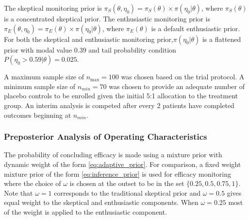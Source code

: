 \documentclass[useAMS,usenatbib,referee]{biom}
\begin{document}
The skeptical monitoring prior is $\pi_S(\theta,\eta_0)=\pi_S(\theta)\times\pi(\eta_0|\theta)$, where $\pi_S(\theta)$ is a concentrated skeptical prior. The enthusiastic monitoring prior is $\pi_E(\theta,\eta_0)=\pi_E(\theta)\times\pi(\eta_0|\theta)$, where $\pi_E(\theta)$ is a default enthusiastic prior. For both the skeptical and enthusiastic monitoring prior,$\pi(\eta_0|\theta)$ is a flattened prior with modal value $0.39$ and tail probability condition $P(\eta_0>0.59 | \theta)=0.025$.


A maximum sample size of $n_{\text{max}}=100$ was chosen based on the trial protocol. A minimum sample size of $n_{min}=70$ was chosen to provide an adequate number of placebo controls to be enrolled given the initial 5:1 allocation to the treatment group.
%
An interim analysis is competed after every 2 patients have completed outcomes beginning at $n_{min}$.

\subsubsection{Preposterior Analysis of Operating Characteristics}\label{sec:ex2operatingcharacteristics} The probability of concluding efficacy is made using a mixture prior with dynamic weight of the form \eqref{eq:adaptive_prior}. For comparison, a fixed weight mixture prior of the form \eqref{eq:inference_prior} is used for efficacy monitoring where the choice of $\omega$ is chosen at the outset to be in the set $\{0.25,0.5,0.75,1\}$. Note that $\omega=1$ corresponds to the traditional skeptical prior and $\omega=0.5$ gives equal weight to the skeptical and enthusiastic components. When $\omega=0.25$ most of the weight is applied to the enthusiastic component. 
\end{document}
